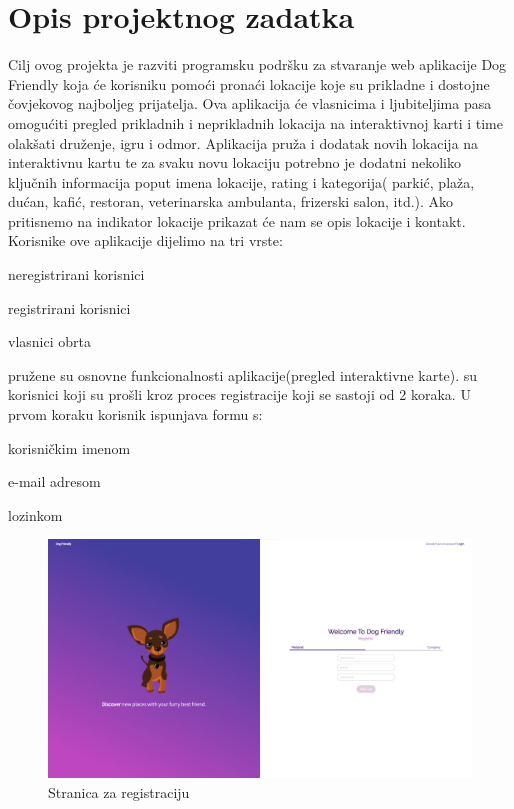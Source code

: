 \chapter{Opis projektnog zadatka}
		
Cilj ovog projekta je razviti programsku podršku za stvaranje web aplikacije Dog Friendly koja će korisniku pomoći pronaći lokacije koje su prikladne i dostojne čovjekovog najboljeg prijatelja. Ova aplikacija  će vlasnicima i ljubiteljima pasa omogućiti pregled prikladnih i neprikladnih lokacija na interaktivnoj karti i time olakšati  druženje, igru i odmor.
Aplikacija  pruža i dodatak novih lokacija na interaktivnu kartu te za svaku novu lokaciju potrebno je dodatni nekoliko ključnih informacija poput imena lokacije, rating i kategorija( parkić, plaža, dućan, kafić, restoran, veterinarska
ambulanta, frizerski salon, itd.). Ako pritisnemo na indikator lokacije prikazat će nam se opis lokacije i kontakt. 
Korisnike ove aplikacije dijelimo na tri vrste:
\begin{packed_item}
	
	\item  neregistrirani korisnici
	\item  registrirani korisnici
	\item  vlasnici obrta
\end{packed_item}
 pružene su osnovne funkcionalnosti aplikacije(pregled interaktivne karte). 
\newline {} su korisnici koji su prošli kroz proces registracije koji se sastoji od 2 koraka. U prvom koraku korisnik ispunjava formu s:
\begin{packed_item}
	
	\item  korisničkim imenom
	\item   e-mail adresom
	\item  lozinkom
\end{packed_item}
\begin{figure}[H]
	\includegraphics[scale=0.23]{slike/RegisterPage.png} 
	\centering
	\caption{Stranica za registraciju}
	\label{fig:promjene}
\end{figure}

